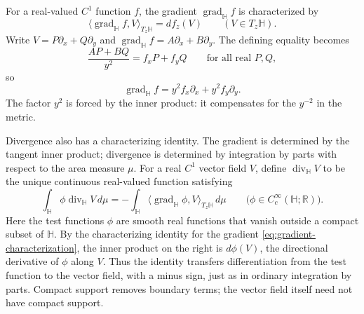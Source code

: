 \label{hyperbolic.gradient}
For a real-valued $C^1$ function $f$, the gradient $\operatorname{grad}_{\mathbb H}f$ is characterized by
\begin{equation}\label{eq:gradient-characterization}
 \langle\operatorname{grad}_{\mathbb H}f,V\rangle_{T_z\mathbb H}=df_z(V)
 \qquad(V\in T_z\mathbb H).
\end{equation}
Write $V=P\partial_x+Q\partial_y$ and $\operatorname{grad}_{\mathbb H}f=A\partial_x+B\partial_y$. The defining equality becomes
\[
 \frac{AP+BQ}{y^2}=f_xP+f_yQ\qquad\text{for all real }P,Q,
\]
so
\begin{equation}\label{eq:gradient-coordinates}
 \operatorname{grad}_{\mathbb H}f=y^2 f_x\partial_x+y^2 f_y\partial_y.
\end{equation}
The factor $y^2$ is forced by the inner product: it compensates for the $y^{-2}$ in the metric.

\label{hyperbolic.divergence}
Divergence also has a characterizing identity. The gradient is determined by the tangent inner product; divergence is determined by integration by parts with respect to the area measure $\mu$. For a real $C^1$ vector field $V$, define $\operatorname{div}_{\mathbb H}V$ to be the unique continuous real-valued function satisfying
\begin{equation}\label{eq:divergence-characterization}
 \int_{\mathbb H}\phi\operatorname{div}_{\mathbb H}V\,d\mu
 =-\int_{\mathbb H}
   \langle\operatorname{grad}_{\mathbb H}\phi,V\rangle_{T_z\mathbb H}\,d\mu
 \qquad\bigl(\phi\in C_c^\infty(\mathbb H;\mathbb R)\bigr).
\end{equation}
Here the test functions $\phi$ are smooth real functions that vanish outside a compact subset of $\mathbb H$. By the characterizing identity for the gradient \eqref{eq:gradient-characterization}, the inner product on the right is $d\phi(V)$, the directional derivative of $\phi$ along $V$. Thus the identity transfers differentiation from the test function to the vector field, with a minus sign, just as in ordinary integration by parts. Compact support removes boundary terms; the vector field itself need not have compact support.

